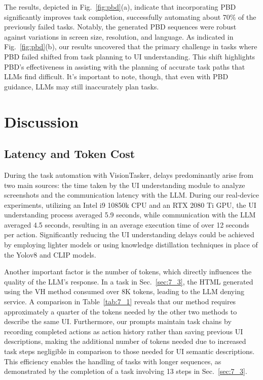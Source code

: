 The results, depicted in Fig.~\ref{fig:pbd}(a), indicate that incorporating PBD significantly improves task completion, successfully automating about 70\% of the previously failed tasks. Notably, the generated PBD sequences were robust against variations in screen size, resolution, and language. As indicated in Fig.~\ref{fig:pbd}(b), our results uncovered that the primary challenge in tasks where PBD failed shifted from task planning to UI understanding. This shift highlights PBD's effectiveness in assisting with the planning of accurate task paths that LLMs find difficult. It's important to note, though, that even with PBD guidance, LLMs may still inaccurately plan tasks.

\section{Discussion}

\subsection{Latency and Token Cost}

During the task automation with VisionTasker, delays predominantly arise from two main sources: the time taken by the UI understanding module to analyze screenshots and the communication latency with the LLM. During our real-device experiments, utilizing an Intel i9 10850k CPU and an RTX 2080 Ti GPU, the UI understanding process averaged 5.9 seconds, while communication with the LLM averaged 4.5 seconds, resulting in an average execution time of over 12 seconds per action. Significantly reducing the UI understanding delays could be achieved by employing lighter models or using knowledge distillation techniques in place of the Yolov8 and CLIP models.

Another important factor is the number of tokens, which directly influences the quality of the LLM's response. In a task in Sec.~\ref{sec:7_3}, the HTML generated using the VH method consumed over 8K tokens, leading to the LLM denying service. A comparison in Table~\ref{tab:7_1} reveals that our method requires approximately a quarter of the tokens needed by the other two methods to describe the same UI. Furthermore, our prompts maintain task chains by recording completed actions as action history rather than saving previous UI descriptions, making the additional number of tokens needed due to increased task steps negligible in comparison to those needed for UI semantic descriptions. This efficiency enables the handling of tasks with longer sequences, as demonstrated by the completion of a task involving 13 steps in Sec.~\ref{sec:7_3}.

